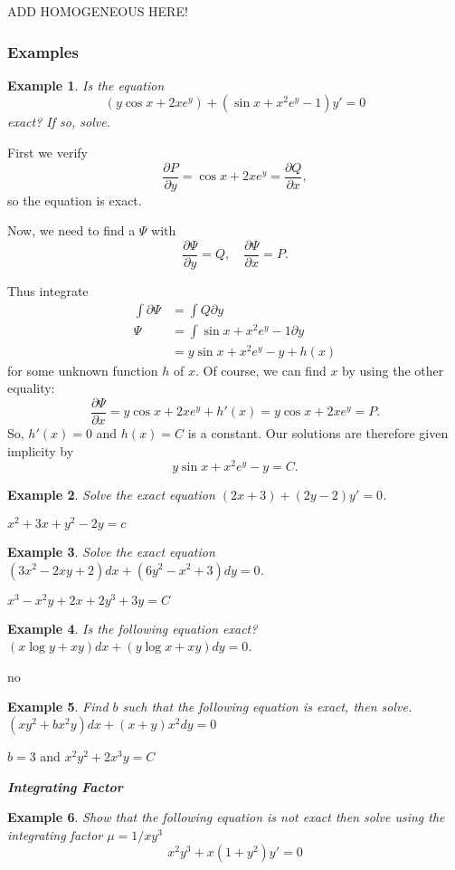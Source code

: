 \documentclass[14pt]{article}
\newtheorem{ex}{Example}
\newcommand{\type}[1]{\begin{center} \emph{\textbf{#1}} \end{center}}
\newcommand{\exs}{\subsubsection*{Examples}}
\begin{document}
ADD HOMOGENEOUS HERE!

\exs

\begin{ex} Is  the equation 
\[(y \cos x + 2 x e^y ) + ( \sin x + x^2 e^y -1) y' = 0 \]
exact? If so, solve.
\end{ex}

First we verify 
\[\frac{\partial P }{\partial y} = \cos x + 2x e^y =\frac{\partial Q }{\partial x},\]
so the equation is exact.

Now, we need to find a $\Psi$ with 
\[\frac{\partial \Psi}{\partial y} = Q,\quad \frac{\partial \Psi}{\partial x} = P. \] 

Thus integrate
\begin{align*}
\int \partial \Psi &= \int Q \partial y \\ 
\Psi &=  \int \sin x + x^2 e^y - 1 \partial y\\
&= y \sin x + x^2 e^y - y + h(x)
\end{align*}
for some unknown function $h$ of $x$. Of course, we can find $x$ by using the other equality:
\[\frac{\partial \Psi}{\partial x } = y \cos x + 2 x e^y + h'(x) =y \cos x + 2 x e^y = P .\]
So, $h'(x) = 0$ and $h(x) = C$ is a constant. Our solutions are therefore given implicity by 
\[ y \sin x + x^2 e^y - y = C.\]

\begin{ex} Solve the exact equation $(2x  + 3) + (2 y -2 ) y' = 0$. \end{ex}
$x^2 + 3x + y^2 - 2y = c$

\begin{ex} Solve the exact equation $(3x^2 - 2xy + 2)dx + (6y^2-x^2+3)dy =0$. \end{ex}
$x^3 - x^2 y + 2 x + 2 y ^3 + 3y = C $

\begin{ex} Is the following equation exact? $(x \log y + xy)dx + (y \log x + x y )dy =0$. \end{ex}
no


\begin{ex}Find $b$ such that the following equation is exact, then solve. $(x y ^2 + b x^2 y )dx + (x + y)x^2 dy = 0$ \end{ex}

$b = 3$ and $x^2 y ^2 + 2 x^3 y = C$

\type{Integrating Factor}

\begin{ex} Show that the following equation is not exact then solve using the integrating factor $\mu = 1 /xy^3$ 
\[x^2y^3 + x(1 + y^2) y' = 0 \]
\end{ex}
\end{document}
